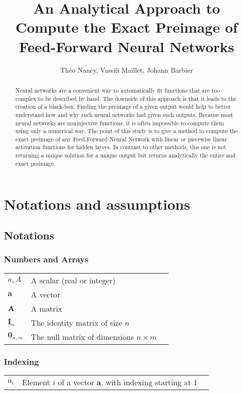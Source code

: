 \documentclass{article}
\title{An Analytical Approach to Compute the Exact Preimage of Feed-Forward Neural Networks}
\author{Théo Nancy, Vassili Maillet, Johann Barbier }
\begin{document}
\maketitle

\begin{abstract}
    Neural networks are a convenient way to automatically fit functions that are too complex to be described by hand. 
    The downside of this approach is that it leads to the creation of a black-box. 
    Finding the preimage of a given output would help to better understand how and why such neural networks had given such outputs. 
    Because most neural networks are noninjective functions, it is often impossible to compute them using only a numerical way. 
    The point of this study is to give a method to compute the exact preimage of any Feed-Forward Neural Network with linear or piecewise 
    linear activation functions for hidden layers. In contrast to other methods, this one is not returning a unique solution for a unique output 
    but returns analytically the entire and exact preimage.
\end{abstract}

\newpage
\section*{Notations and assumptions}
\subsection*{Notations}
\subsubsection*{Numbers and Arrays}

 \begin{tabular}{p{2cm}p{10cm}p{1cm}}
    $a,A$   & A scalar (real or integer)\\
    $\textbf{a}$  & A vector \\
    $\textbf{A}$  & A matrix\\
    $\textbf{I}_{n}$  & The identity matrix of size $n$\\
    $\textbf{0}_{n,m}$  & The null matrix of dimensions $n \times m$
    \end{tabular}
    
\subsubsection*{Indexing}
\begin{tabular}{p{2cm}p{10cm}p{1cm}}
    $a_{i}$   & Element $i$ of a vector $\textbf{a}$, with indexing starting at 1\\
    \end{tabular}
\end{document}
